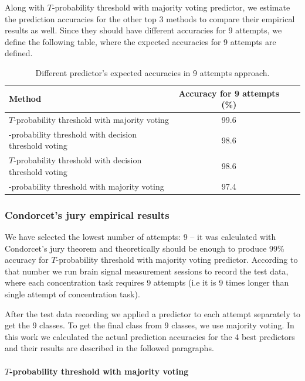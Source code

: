 \documentclass[12pt]{article}
\theoremstyle{definition}
\begin{document}
Along with $T$-probability threshold with majority voting predictor, we estimate the prediction accuracies for the other top 3 methods to compare their empirical results as well. Since they should have different accuracies for 9 attempts, we define the following table, where the expected accuracies for 9 attempts are defined.

\begin{table}[H]
\label{tab:title} 
\begin{center}
  \begin{tabular}{ | l | c | c | c | }
    \hline
    Method &\parbox[c]{1.8cm}{\raggedright Accuracy for 9 attempts (\%)}\\ \hline
    $T$-probability threshold with majority voting & 99.6 \\ \hline
    -probability threshold with decision threshold voting & 98.6 \\ \hline
	$T$-probability threshold with decision threshold voting & 98.6 \\ \hline
	-probability threshold with majority voting & 97.4 \\ \hline
  \end{tabular}
\end{center}
\caption{Different predictor's expected accuracies in 9 attempts approach.}
\end{table}

\subsubsection{Condorcet's jury empirical results}

We have selected the lowest number of attempts: 9 -- it was calculated with Condorcet's jury theorem and theoretically should be enough to produce 99\% accuracy for $T$-probability threshold with majority voting predictor. According to that number we run brain signal measurement sessions to record the test data, where each concentration task requires 9 attempts (i.e it is 9 times longer than single attempt of concentration task).

After the test data recording we applied a predictor to each attempt separately to get the 9 classes. To get the final class from 9 classes, we use majority voting. In this work we calculated the actual prediction accuracies for the 4 best predictors and their results are described in the followed paragraphs.

\paragraph{$T$-probability threshold with majority voting}~\\
\end{document}
